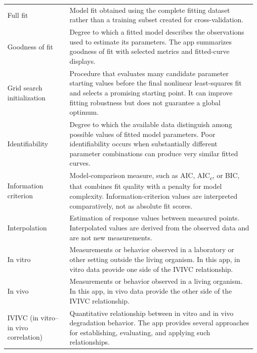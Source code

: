 \begin{longtable}{@{}>{\raggedright\arraybackslash}p{}>{\raggedright\arraybackslash}p{}@{}}
Full fit & Model fit obtained using the complete fitting dataset rather than a training subset created for cross-validation. \\

Goodness of fit & Degree to which a fitted model describes the observations used to estimate its parameters. The app summarizes goodness of fit with selected metrics and fitted-curve displays. \\

Grid search initialization & Procedure that evaluates many candidate parameter starting values before the final nonlinear least-squares fit and selects a promising starting point. It can improve fitting robustness but does not guarantee a global optimum. \\

Identifiability & Degree to which the available data distinguish among possible values of fitted model parameters. Poor identifiability occurs when substantially different parameter combinations can produce very similar fitted curves. \\

Information criterion & Model-comparison measure, such as AIC, AIC\textsubscript{c}, or BIC, that combines fit quality with a penalty for model complexity. Information-criterion values are interpreted comparatively, not as absolute fit scores. \\

Interpolation & Estimation of response values between measured points. Interpolated values are derived from the observed data and are not new measurements. \\

In vitro & Measurements or behavior observed in a laboratory or other setting outside the living organism. In this app, in vitro data provide one side of the IVIVC relationship. \\

In vivo & Measurements or behavior observed in a living organism. In this app, in vivo data provide the other side of the IVIVC relationship. \\

IVIVC (in vitro--in vivo correlation) & Quantitative relationship between in vitro and in vivo degradation behavior. The app provides several approaches for establishing, evaluating, and applying such relationships. \\



\end{longtable}
